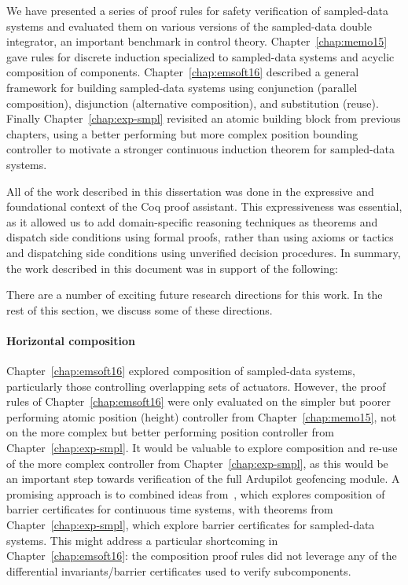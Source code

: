 We have presented a series of proof rules for safety verification of
sampled-data systems and evaluated them on various versions of the
sampled-data double integrator, an important benchmark in control
theory. Chapter~\ref{chap:memo15} gave rules for discrete induction
specialized to sampled-data systems and acyclic composition of
components. Chapter~\ref{chap:emsoft16} described a general framework for
building sampled-data systems using conjunction (parallel composition),
disjunction (alternative composition), and substitution (reuse). Finally
Chapter~\ref{chap:exp-smpl} revisited an atomic building block from
previous chapters, using a better performing but more complex position
bounding controller to motivate a stronger continuous induction theorem for
sampled-data systems.

All of the work described in this dissertation was done in the expressive
and foundational context of the Coq proof assistant. This expressiveness
was essential, as it allowed us to add domain-specific reasoning techniques
as theorems and dispatch side conditions using formal proofs, rather than
using axioms or tactics and dispatching side conditions using unverified
decision procedures. In summary, the work described in this document was in
support of the following:

\thesis

There are a number of exciting future research directions for this work. In
the rest of this section, we discuss some of these directions.

\paragraph{Horizontal composition}
Chapter~\ref{chap:emsoft16} explored composition of sampled-data systems,
particularly those controlling overlapping sets of actuators. However, the
proof rules of Chapter~\ref{chap:emsoft16} were only evaluated on the
simpler but poorer performing atomic position (height) controller from
Chapter~\ref{chap:memo15}, not on the more complex but better performing
position controller from Chapter~\ref{chap:exp-smpl}. It would be valuable
to explore composition and re-use of the more complex controller from
Chapter~\ref{chap:exp-smpl}, as this would be an important step towards
verification of the full Ardupilot geofencing module. A promising approach
is to combined ideas from~\cite{xu16sharing}, which explores composition of
barrier certificates for continuous time systems, with theorems from
Chapter~\ref{chap:exp-smpl}, which explore barrier certificates for
sampled-data systems. This might address a particular shortcoming in
Chapter~\ref{chap:emsoft16}: the composition proof rules did not leverage
any of the differential invariants/barrier certificates used to verify
subcomponents.

